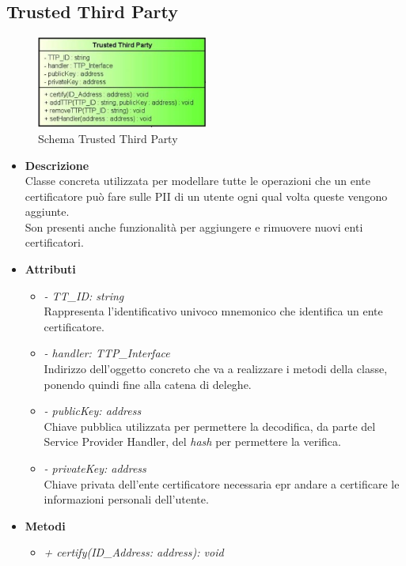 \subsection{Trusted Third Party}
\begin{figure}[!h]
	\centering
	\includegraphics[width=0.5\textwidth]{immagini/ttpData}
	\caption{Schema Trusted Third Party}
\end{figure}
\begin{itemize}
	\item \textbf{Descrizione}\\
	Classe concreta utilizzata per modellare tutte le operazioni che un ente certificatore può fare sulle \gls{PII} di un utente ogni qual volta queste vengono aggiunte.\\
	Son presenti anche funzionalità per aggiungere e rimuovere nuovi enti certificatori.
	\item \textbf{Attributi}
	\begin{itemize}
		\item \textit{- TT\_ID: string}\\
		Rappresenta l'identificativo univoco mnemonico che identifica un ente certificatore.
		\item \textit{- handler: TTP\_Interface}\\
		Indirizzo dell'oggetto concreto che va a realizzare i metodi della classe, ponendo quindi fine alla catena di deleghe.
		\item \textit{- publicKey: address}\\
		Chiave pubblica utilizzata per permettere la decodifica, da parte del Service Provider Handler, del \textit{hash} per permettere la verifica.
		\item \textit{- privateKey: address}\\
		Chiave privata dell'ente certificatore necessaria epr andare a certificare le informazioni personali dell'utente.
	\end{itemize}
	\item \textbf{Metodi}
	\begin{itemize}
		\item \textit{+ certify(ID\_Address: address): void}\\

\end{itemize}
\end{itemize}
